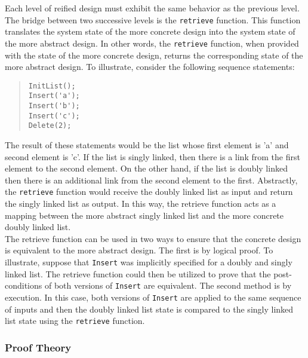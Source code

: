 \documentclass[11pt]{article}
\begin{document}
Each level of reified design must exhibit the same behavior as the previous level.  The bridge between two successive levels is the {\tt retrieve} function.  This function translates the system state of the more concrete design into the system state of the more abstract design.  In other words, the {\tt retrieve} function, when provided with the state of the more concrete design, returns the corresponding state of the more abstract design.  To illustrate, consider the following sequence statements:
\begin{quote}
\begin{verbatim}
InitList();
Insert('a');
Insert('b');
Insert('c');
Delete(2);
\end{verbatim}
\end{quote}

The result of these statements would be the list whose first element is 'a' and second element is 'c'.  If the list is singly linked, then there is a link from the first element to the second element.  On the other hand, if the list is doubly linked then there is an additional link from the second element to the first.  Abstractly, the {\tt retrieve} function would receive the doubly linked list as input and return the singly linked list as output.  In this way, the retrieve function acts as a mapping between the more abstract singly linked list and the more concrete doubly linked list.\\

The retrieve function can be used in two ways to ensure that the concrete design is equivalent to the more abstract design.  The first is by logical proof.  To illustrate, suppose that {\tt Insert} was implicitly specified for a doubly and singly linked list.  The retrieve function could then be utilized to prove that the post-conditions of both versions of {\tt Insert} are equivalent.  The second method is by execution.  In this case, both versions of {\tt Insert} are applied to the same sequence of inputs and then the doubly linked list state is compared to the singly linked list state using the {\tt retrieve} function.   
\subsubsection{Proof Theory}
\end{document}
